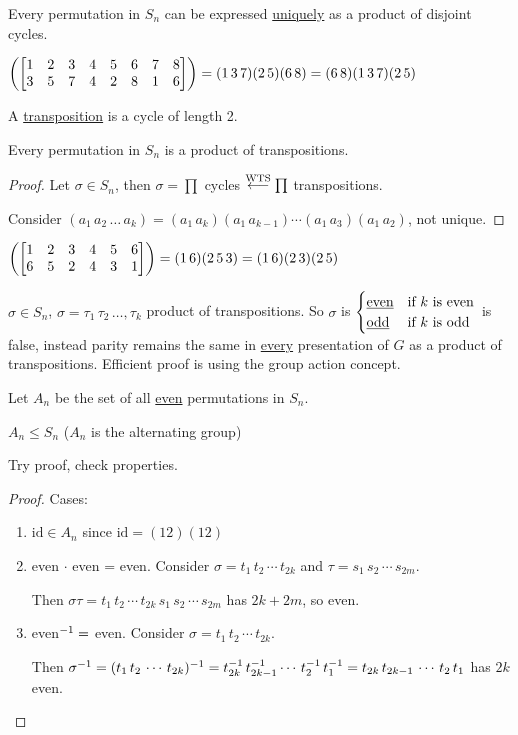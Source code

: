 \documentclass[]{article}
\begin{document}
\begin{theorem}
	Every permutation in $S_n$ can be expressed \ul{uniquely} as a product of disjoint cycles.
\end{theorem}
\begin{example}
	$\left(\begin{bmatrix}1&2&3&4&5&6&7&8\\3&5&7&4&2&8&1&6\end{bmatrix}\right) = (1\,3\,7)(2\,5)(6\,8) = (6\,8)(1\,3\,7)(2\,5)$
\end{example}
\begin{definition}
	A \ul{transposition} is a cycle of length 2.
\end{definition}
\begin{proposition}
	Every permutation in $S_n$ is a product of transpositions.
\end{proposition}
\begin{proof}
	Let $\sigma\in S_n$, then $\sigma = \prod$ cycles $\overset{\text{WTS}}{\longleftarrow} \prod$ transpositions.
	
	Consider $(a_1\,a_2\,\dots\,a_k) = (a_1\,a_k)(a_1\,a_{k-1})\cdots(a_1\,a_3)(a_1\,a_2)$, not unique.
\end{proof}
\begin{example}
	$\left(\begin{bmatrix}1&2&3&4&5&6\\6&5&2&4&3&1\end{bmatrix}\right) = (1\,6)(2\,5\,3) = (1\,6)(2\,3)(2\,5)$
\end{example}

$\sigma\in S_n$, $\sigma = \tau_1\,\tau_2\,\dots,\tau_k$ product of transpositions.
So $\sigma$ is $\begin{cases} \text{\underline{even}} & \text{if $k$ is even} \\ \text{\underline{odd}} & \text{if $k$ is odd} \end{cases}$ is false, instead parity remains the same in \ul{every} presentation of $G$ as a product of transpositions. Efficient proof is using the group action concept.

Let $A_n$ be the set of all \ul{even} permutations in $S_n$.
\begin{proposition}
	$A_n\leq S_n$ ($A_n$ is the alternating group)
\end{proposition}
Try proof, check properties.

\begin{proof}
	Cases:
	\begin{enumerate}
		\item $\text{id}\in A_n$ since $\text{id} = (12)(12)$
		\item even $\cdot$ even = even. Consider $\sigma = t_1\,t_2\,\cdots\,t_{2k}$ and $\tau = s_1\,s_2\,\cdots\,s_{2m}$.
			
			Then $\sigma\tau = t_1\,t_2\,\cdots\,t_{2k}\,s_1\,s_2\,\cdots\,s_{2m}$ has $2k+2m$, so even.
		\item even$^{-1} =$ even. Consider $\sigma = t_1\,t_2\,\cdots\,t_{2k}$.
			
			Then $\sigma^{-1} = (t_1\,t_2\,\cdots\,t_{2k})^{-1} = t_{2k}^{-1}\,t_{2k-1}^{-1}\cdots\, t_2^{-1}\,t_1^{-1} = t_{2k}\,t_{2k-1}\,\cdots\,t_2\,t_1$ has $2k$ even.
	\end{enumerate}
\end{proof}
\end{document}
